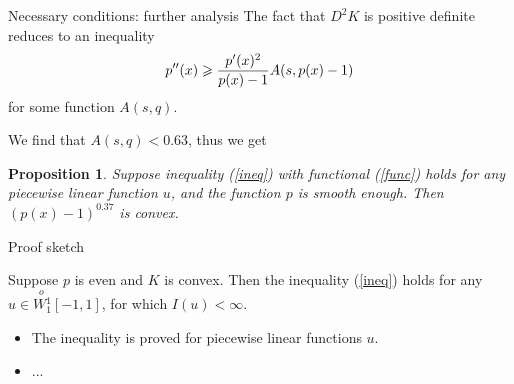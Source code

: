 \documentclass{beamer}\usepackage[]{graphicx}\usepackage[]{color}
\renewcommand{\ge}{\geqslant}
\newcommand{\Wf}{\stackrel{o\ }{W{}_1^1}}
\newtheorem{prop}{Proposition}
\begin{document}
\begin{frame}{Necessary conditions: further analysis}
The fact that $D^2 K$ is positive definite reduces to an inequality
$$p''(x) \ge {p'(x)^2 \over p(x) - 1} A(s, p(x) - 1)$$
for some function $A(s, q)$.

We find that $A(s, q) < 0.63$, thus we get
\begin{prop}
Suppose inequality (\ref{ineq}) with functional (\ref{func}) holds for any piecewise linear function $u$,
and the function $p$ is smooth enough.
Then $(p(x) - 1)^{0.37}$ is convex.
\end{prop}

\end{frame}

\begin{frame}{Proof sketch}

\begin{theorem}
Suppose $p$ is even and $K$ is convex.
Then the inequality (\ref{ineq}) holds for any $u \in \Wf[-1, 1]$, for which $I(u) < \infty$.
\end{theorem}

\begin{itemize}
\item The inequality is proved for piecewise linear functions $u$.

\item ...
\end{itemize}

\end{frame}
\end{document}
